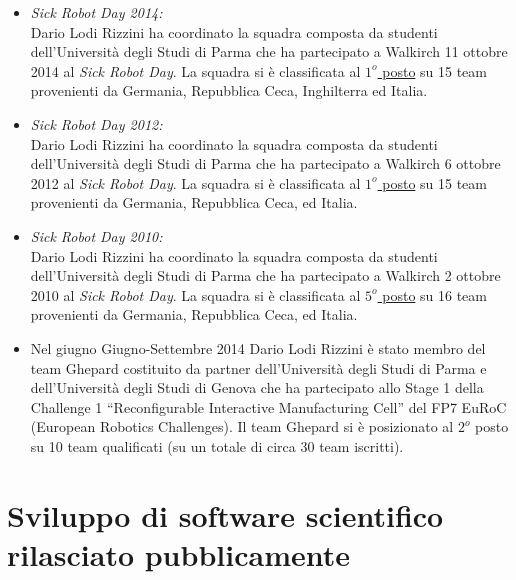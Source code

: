 \documentclass[11pt]{article}
\newcommand{\ITEMDATE}[1]{\item \textit{#1:}\\}
\begin{document}
\begin{itemize}

\ITEMDATE{Sick Robot Day 2014}
Dario Lodi Rizzini ha coordinato la squadra composta da studenti dell'Universit\`a degli Studi di Parma
che ha partecipato a Walkirch 11 ottobre 2014 al \emph{Sick Robot Day}.
La squadra si \`e classificata al \underline{$1^o$ posto} su 15 team provenienti da Germania, Repubblica Ceca,
Inghilterra ed Italia. 

\ITEMDATE{Sick Robot Day 2012}
Dario Lodi Rizzini ha coordinato la squadra composta da studenti dell'Universit\`a degli Studi di Parma
che ha partecipato a Walkirch 6 ottobre 2012 al \emph{Sick Robot Day}.
La squadra si \`e classificata al \underline{$1^o$ posto} su 15 team provenienti da Germania, Repubblica Ceca,
ed Italia. 

\ITEMDATE{Sick Robot Day 2010}
Dario Lodi Rizzini ha coordinato la squadra composta da studenti dell'Universit\`a degli Studi di Parma
che ha partecipato a Walkirch 2 ottobre 2010 al \emph{Sick Robot Day}.
La squadra si \`e classificata al \underline{$5^o$ posto} su 16 team provenienti da Germania, Repubblica Ceca,
ed Italia. 

\end{itemize}

\begin{itemize}
\item Nel giugno Giugno-Settembre 2014 Dario Lodi Rizzini \`e stato membro del team Ghepard costituito da partner dell'Universit\`a degli Studi di Parma e dell'Universit\`a degli Studi di Genova che ha partecipato allo Stage 1 della Challenge 1 ``Reconfigurable Interactive Manufacturing Cell'' del FP7 EuRoC (European Robotics Challenges).
Il team Ghepard si \`e posizionato al $2^o$ posto su 10 team qualificati (su un totale di circa 30 team iscritti).
\end{itemize}



\section*{Sviluppo di software scientifico rilasciato pubblicamente}
\end{document}
